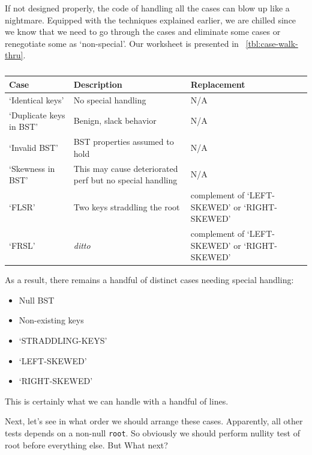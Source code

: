 \documentclass[oneside,11pt]{book}
\theoremstyle{definition}
\theoremstyle{remark}
\newcommand{\code}[1]{\mbox{\lstinline{#1}}}
\begin{document}
If not designed properly, the code of handling all the cases can blow up like a nightmare.
Equipped with the techniques explained earlier, we are chilled since we know that we need to
go through the cases and eliminate some cases or renegotiate some as `non-special'.
Our worksheet is presented in ~\autoref{tbl:case-walk-thru}.
\begin{table}[bth]
    \begin{center}
        \caption{
        \label{tbl:case-walk-thru}}
        \begin{tabular}{|p{}|p{}|p{}|}
            \hline
            Case & Description & Replacement \\
            \hline
            `Identical keys' & No special handling & N/A \\
            \hline
            `Duplicate keys in BST' & Benign, slack behavior & N/A \\
            \hline
            `Invalid BST' & BST properties assumed to hold & N/A \\
            \hline
            `Skewness in BST' & This may cause deteriorated perf but no special handling & N/A  \\
            \hline
            `FLSR' & Two keys straddling the root & complement of `LEFT-SKEWED' or `RIGHT-SKEWED' \\
            \hline
            `FRSL' & \textit{ditto} & complement of `LEFT-SKEWED' or `RIGHT-SKEWED' \\
            \hline
        \end{tabular}
    \end{center}
\end{table}
As a result, there remains a handful of distinct cases needing special handling:
\begin{itemize}
    \item Null BST
    \item Non-existing keys
    \item `STRADDLING-KEYS'
    \item `LEFT-SKEWED'
    \item `RIGHT-SKEWED'
\end{itemize}
This is certainly what we can handle with a handful of lines.


Next, let's see in what order we should arrange these cases.
Apparently, all other tests depends on a non-null \code{root}.
So obviously we should perform nullity test of root before everything else.
But What next?
\end{document}
